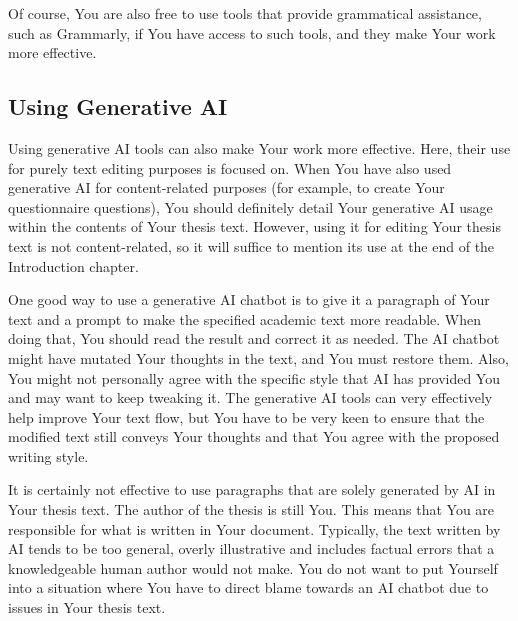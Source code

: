 Of course, You are also free to use tools that provide grammatical assistance, such as Grammarly, if You have access to such tools, and they make Your work more effective.

\subsection{Using Generative AI}
Using generative AI tools can also make Your work more effective. Here, their use for purely text editing purposes is focused on. When You have also used generative AI for content-related purposes (for example, to create Your questionnaire questions), You should definitely detail Your generative AI usage within the contents of Your thesis text. However, using it for editing Your thesis text is not content-related, so it will suffice to mention its use at the end of the Introduction chapter.

One good way to use a generative AI chatbot is to give it a paragraph of Your text and a prompt to make the specified academic text more readable. When doing that, You should read the result and correct it as needed. The AI chatbot might have mutated Your thoughts in the text, and You must restore them. Also, You might not personally agree with the specific style that AI has provided You and may want to keep tweaking it. The generative AI tools can very effectively help improve Your text flow, but You have to be very keen to ensure that the modified text still conveys Your thoughts and that You agree with the proposed writing style.

It is certainly not effective to use paragraphs that are solely generated by AI in Your thesis text. The author of the thesis is still You. This means that You are responsible for what is written in Your document. Typically, the text written by AI tends to be too general, overly illustrative and includes factual errors that a knowledgeable human author would not make. You do not want to put Yourself into a situation where You have to direct blame towards an AI chatbot due to issues in Your thesis text.
